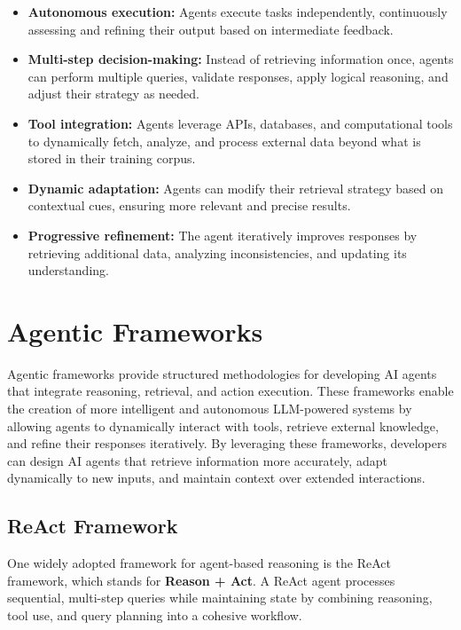\begin{itemize}
    \item \textbf{Autonomous execution:} Agents execute tasks independently, continuously assessing and refining their output based on intermediate feedback.
    \item \textbf{Multi-step decision-making:} Instead of retrieving information once, agents can perform multiple queries, validate responses, apply logical reasoning, and adjust their strategy as needed.
    \item \textbf{Tool integration:} Agents leverage APIs, databases, and computational tools to dynamically fetch, analyze, and process external data beyond what is stored in their training corpus.
    \item \textbf{Dynamic adaptation:} Agents can modify their retrieval strategy based on contextual cues, ensuring more relevant and precise results.
    \item \textbf{Progressive refinement:} The agent iteratively improves responses by retrieving additional data, analyzing inconsistencies, and updating its understanding.
\end{itemize}

\section{Agentic Frameworks}

Agentic frameworks provide structured methodologies for developing AI agents that integrate reasoning, retrieval, and action execution. These frameworks enable the creation of more intelligent and autonomous LLM-powered systems by allowing agents to dynamically interact with tools, retrieve external knowledge, and refine their responses iteratively. By leveraging these frameworks, developers can design AI agents that retrieve information more accurately, adapt dynamically to new inputs, and maintain context over extended interactions.


\subsection{ReAct Framework}

One widely adopted framework for agent-based reasoning is the ReAct framework, which stands for \textbf{Reason + Act}. A ReAct agent processes sequential, multi-step queries while maintaining state by combining reasoning, tool use, and query planning into a cohesive workflow.

